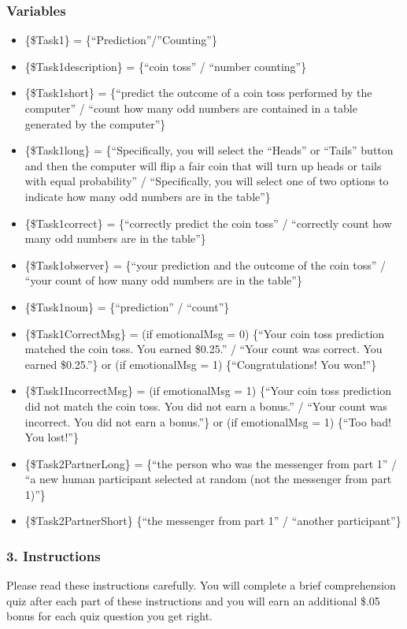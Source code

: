 \subsubsection*{Variables}
\begin{itemize}
\item \{\$Task1\} = \{``Prediction''/''Counting''\} 
\item \{\$Task1description\} = \{``coin toss''
/ ``number counting''\} 
\item \{\$Task1short\} = \{``predict the outcome of a coin toss
performed by the computer'' / ``count how many odd numbers are contained in a
table generated by the computer''\} 
\item \{\$Task1long\} = \{``Specifically, you will
select the ``Heads'' or ``Tails'' button and then the computer will flip a fair
coin that will turn up heads or tails with equal probability'' / ``Specifically,
you will select one of two options to indicate how many odd numbers are in the
table''\} 
\item \{\$Task1correct\} = \{``correctly predict the coin toss'' / ``correctly
count how many odd numbers are in the table''\} 
\item \{\$Task1observer\} = \{``your
prediction and the outcome of the coin toss'' / ``your count of how many odd
numbers are in the table''\} 
\item \{\$Task1noun\} = \{``prediction'' / ``count''\}
\item \{\$Task1CorrectMsg\} = (if emotionalMsg = 0) \{``Your coin toss prediction matched the coin toss. You
earned \$0.25.'' / ``Your count was correct. You earned \$0.25.''\} or 
(if emotionalMsg = 1) \{``Congratulations! You won!''\} 
\item \{\$Task1IncorrectMsg\} = (if emotionalMsg = 1) \{``Your coin toss prediction did not match the coin toss.
You did not earn a bonus.'' / ``Your count was incorrect. You did not earn a
bonus.''\} or (if emotionalMsg = 1) \{``Too bad! You lost!''\}
\item \{\$Task2PartnerLong\} = \{``the person who was the messenger from part 1'' / ``a
new human participant selected at random (not the messenger from part 1)''\}
\item \{\$Task2PartnerShort\} \{``the messenger from part 1'' / ``another participant''\}
\end{itemize}

\subsubsection*{3. Instructions}
Please read these instructions carefully. You will complete a brief
comprehension quiz after each part of these instructions and you will earn an
additional \$.05 bonus for each quiz question you get right. 

